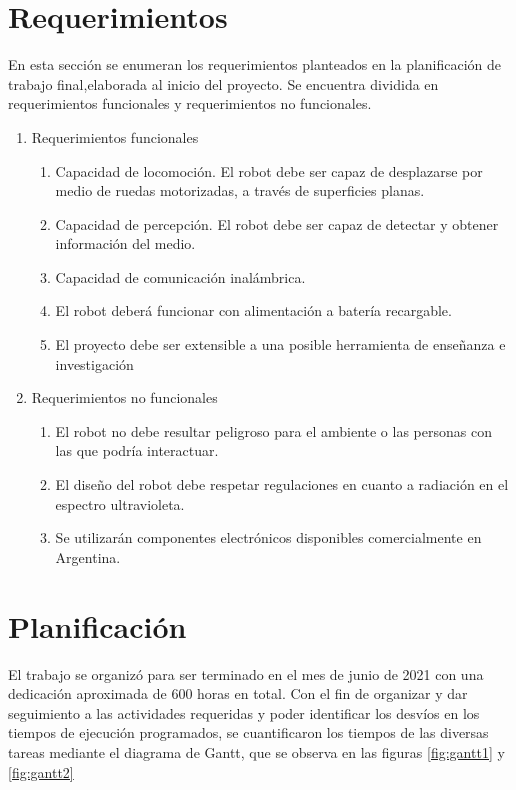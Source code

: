 \section{Requerimientos}

En esta sección se enumeran los requerimientos planteados en la planificación de trabajo final,elaborada al inicio del proyecto. Se encuentra dividida en requerimientos funcionales y requerimientos no funcionales.

\label{sec:requerimientos}

\begin{enumerate}
\item Requerimientos funcionales
	\begin{enumerate}
	\item Capacidad de locomoción.  El robot debe ser capaz de desplazarse por medio de ruedas motorizadas, a través de superficies planas.
	\item Capacidad de percepción. El robot debe ser capaz de detectar y obtener información del medio. 
	\item Capacidad de comunicación inalámbrica.
	\item El robot deberá funcionar con alimentación a batería recargable.
	\item El proyecto debe ser extensible a una posible herramienta de enseñanza e investigación

	\end{enumerate}
\item Requerimientos no funcionales
	\begin{enumerate}
	\item El robot no debe resultar peligroso para el ambiente o las personas con las que podría interactuar.
	\item El diseño del robot debe respetar regulaciones en cuanto a radiación en el espectro ultravioleta.
	\item Se utilizarán componentes electrónicos disponibles comercialmente en Argentina.
	\end{enumerate}
\end{enumerate}

\section{Planificación}

El trabajo se organizó para ser terminado en el mes de junio de 2021 con una dedicación aproximada de 600 horas en total. Con el fin de organizar y dar seguimiento a las actividades requeridas y poder identificar los desvíos en los tiempos de ejecución programados, se cuantificaron los tiempos de las diversas tareas mediante el diagrama de Gantt, que se observa en las figuras \ref{fig:gantt1} y \ref{fig:gantt2}


